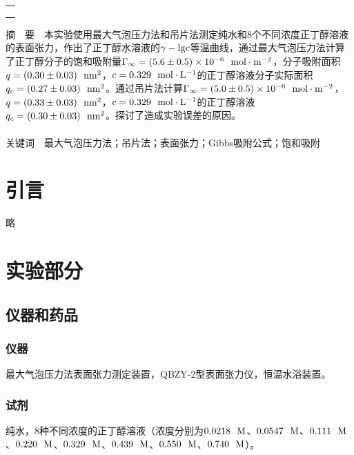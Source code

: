 \documentclass[12pt]{article}
\begin{document}
\begin{titlepage}
\begin{center}
            \begin{tabular*}{\textwidth}{c}
                \\ %
                \\ %
                \\ %
                \\ %
                \hline %
            \end{tabular*}
        \end{center}
        \textsf{摘\ \ 要}\ \ 本实验使用最大气泡压力法和吊片法测定纯水和8个不同浓度正丁醇溶液的表面张力，作出了正丁醇水溶液的$\gamma-{\rm lg}c$等温曲线，通过最大气泡压力法计算了正丁醇分子的饱和吸附量$\Gamma_{\infty}=(5.6\pm 0.5)\times10^{-6}\ \ {\rm mol\cdot m^{-2}}$，分子吸附面积$q=(0.30\pm 0.03)\ \ {\rm nm^{2}}$，$c=0.329\ \ {\rm mol\cdot L^{-1}}$的正丁醇溶液分子实际面积$q_{c}=(0.27\pm 0.03)\ \ {\rm nm^{2}}$。通过吊片法计算$\Gamma_{\infty}=(5.0\pm 0.5)\times10^{-6}\ \ {\rm mol\cdot m^{-2}}$，$q=(0.33\pm 0.03)\ \ {\rm nm^{2}}$，$c=0.329\ \ {\rm mol\cdot L^{-1}}$的正丁醇溶液$q_{c}=(0.30\pm 0.03)\ \ {\rm nm^{2}}$。探讨了造成实验误差的原因。
        \\
        \\
        \textsf{关键词}\ \ 最大气泡压力法；吊片法；表面张力；Gibbs吸附公式；饱和吸附
    \end{titlepage}

    \section{引言}
	略
               
\vbox{}        
    \section{实验部分}
    	\subsection{仪器和药品}
    	\subsubsection{仪器}
    	最大气泡压力法表面张力测定装置，QBZY-2型表面张力仪，恒温水浴装置。
    	\subsubsection{试剂}
    	纯水，$8$种不同浓度的正丁醇溶液（浓度分别为$0.0218\ \ {\rm M}$、$0.0547\ \ {\rm M}$、$0.111\ \ {\rm M}$、$0.220\ \ {\rm M}$、$0.329\ \ {\rm M}$、$0.439\ \ {\rm M}$、$0.550\ \ {\rm M}$、$0.740\ \ {\rm M}$）。
\vbox{}
\end{document}
